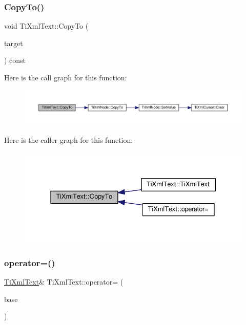 \subsubsection{\texorpdfstring{Copy\+To()}{CopyTo()}}
{\footnotesize\ttfamily void Ti\+Xml\+Text\+::\+Copy\+To (\begin{DoxyParamCaption}\item[{\hyperlink{class_ti_xml_text}{Ti\+Xml\+Text} $\ast$}]{target }\end{DoxyParamCaption}) const\hspace{0.3cm}{\ttfamily [protected]}}

Here is the call graph for this function\+:\nopagebreak
\begin{figure}[H]
\begin{center}
\leavevmode
\includegraphics[width=350pt]{class_ti_xml_text_a480b8e0ad6b7833a73ecf2191195c9b5_cgraph}
\end{center}
\end{figure}
Here is the caller graph for this function\+:\nopagebreak
\begin{figure}[H]
\begin{center}
\leavevmode
\includegraphics[width=331pt]{class_ti_xml_text_a480b8e0ad6b7833a73ecf2191195c9b5_icgraph}
\end{center}
\end{figure}
\mbox{\label{class_ti_xml_text_aed5b13f9c1b804c616fd533882c29f57}} 
\subsubsection{\texorpdfstring{operator=()}{operator=()}}
{\footnotesize\ttfamily \hyperlink{class_ti_xml_text}{Ti\+Xml\+Text}\& Ti\+Xml\+Text\+::operator= (\begin{DoxyParamCaption}\item[{const \hyperlink{class_ti_xml_text}{Ti\+Xml\+Text} \&}]{base }\end{DoxyParamCaption})\hspace{0.3cm}{\ttfamily [inline]}}

